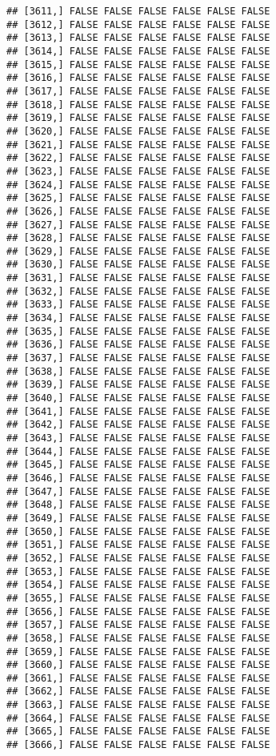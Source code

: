 \documentclass[
]{article}
\begin{document}
\begin{verbatim}
## [3611,] FALSE FALSE FALSE FALSE FALSE FALSE
## [3612,] FALSE FALSE FALSE FALSE FALSE FALSE
## [3613,] FALSE FALSE FALSE FALSE FALSE FALSE
## [3614,] FALSE FALSE FALSE FALSE FALSE FALSE
## [3615,] FALSE FALSE FALSE FALSE FALSE FALSE
## [3616,] FALSE FALSE FALSE FALSE FALSE FALSE
## [3617,] FALSE FALSE FALSE FALSE FALSE FALSE
## [3618,] FALSE FALSE FALSE FALSE FALSE FALSE
## [3619,] FALSE FALSE FALSE FALSE FALSE FALSE
## [3620,] FALSE FALSE FALSE FALSE FALSE FALSE
## [3621,] FALSE FALSE FALSE FALSE FALSE FALSE
## [3622,] FALSE FALSE FALSE FALSE FALSE FALSE
## [3623,] FALSE FALSE FALSE FALSE FALSE FALSE
## [3624,] FALSE FALSE FALSE FALSE FALSE FALSE
## [3625,] FALSE FALSE FALSE FALSE FALSE FALSE
## [3626,] FALSE FALSE FALSE FALSE FALSE FALSE
## [3627,] FALSE FALSE FALSE FALSE FALSE FALSE
## [3628,] FALSE FALSE FALSE FALSE FALSE FALSE
## [3629,] FALSE FALSE FALSE FALSE FALSE FALSE
## [3630,] FALSE FALSE FALSE FALSE FALSE FALSE
## [3631,] FALSE FALSE FALSE FALSE FALSE FALSE
## [3632,] FALSE FALSE FALSE FALSE FALSE FALSE
## [3633,] FALSE FALSE FALSE FALSE FALSE FALSE
## [3634,] FALSE FALSE FALSE FALSE FALSE FALSE
## [3635,] FALSE FALSE FALSE FALSE FALSE FALSE
## [3636,] FALSE FALSE FALSE FALSE FALSE FALSE
## [3637,] FALSE FALSE FALSE FALSE FALSE FALSE
## [3638,] FALSE FALSE FALSE FALSE FALSE FALSE
## [3639,] FALSE FALSE FALSE FALSE FALSE FALSE
## [3640,] FALSE FALSE FALSE FALSE FALSE FALSE
## [3641,] FALSE FALSE FALSE FALSE FALSE FALSE
## [3642,] FALSE FALSE FALSE FALSE FALSE FALSE
## [3643,] FALSE FALSE FALSE FALSE FALSE FALSE
## [3644,] FALSE FALSE FALSE FALSE FALSE FALSE
## [3645,] FALSE FALSE FALSE FALSE FALSE FALSE
## [3646,] FALSE FALSE FALSE FALSE FALSE FALSE
## [3647,] FALSE FALSE FALSE FALSE FALSE FALSE
## [3648,] FALSE FALSE FALSE FALSE FALSE FALSE
## [3649,] FALSE FALSE FALSE FALSE FALSE FALSE
## [3650,] FALSE FALSE FALSE FALSE FALSE FALSE
## [3651,] FALSE FALSE FALSE FALSE FALSE FALSE
## [3652,] FALSE FALSE FALSE FALSE FALSE FALSE
## [3653,] FALSE FALSE FALSE FALSE FALSE FALSE
## [3654,] FALSE FALSE FALSE FALSE FALSE FALSE
## [3655,] FALSE FALSE FALSE FALSE FALSE FALSE
## [3656,] FALSE FALSE FALSE FALSE FALSE FALSE
## [3657,] FALSE FALSE FALSE FALSE FALSE FALSE
## [3658,] FALSE FALSE FALSE FALSE FALSE FALSE
## [3659,] FALSE FALSE FALSE FALSE FALSE FALSE
## [3660,] FALSE FALSE FALSE FALSE FALSE FALSE
## [3661,] FALSE FALSE FALSE FALSE FALSE FALSE
## [3662,] FALSE FALSE FALSE FALSE FALSE FALSE
## [3663,] FALSE FALSE FALSE FALSE FALSE FALSE
## [3664,] FALSE FALSE FALSE FALSE FALSE FALSE
## [3665,] FALSE FALSE FALSE FALSE FALSE FALSE
## [3666,] FALSE FALSE FALSE FALSE FALSE FALSE

\end{verbatim}
\end{document}
